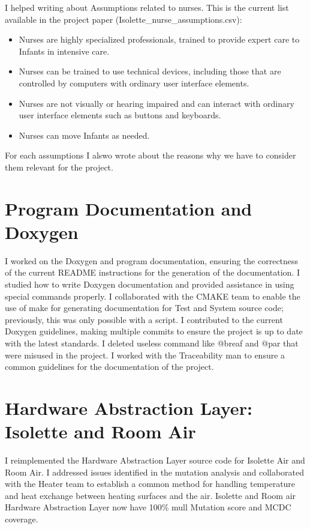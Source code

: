 \documentclass[a4paper, 12pt]{article}
\begin{document}
I helped writing about Assumptions related to nurses. 
This is the current list available in the project paper (Isolette\_nurse\_assumptions.csv):

\begin{itemize}
    \item Nurses are highly specialized professionals, trained to provide expert care to Infants in intensive care.
    \item Nurses can be trained to use technical devices, including those that are controlled by computers with ordinary user interface elements.
    \item Nurses are not visually or hearing impaired and can interact with ordinary user interface elements such as buttons and keyboards.
    \item Nurses can move Infants as needed.
\end{itemize}

For each assumptions I alswo wrote about the reasons why we have to consider them relevant for the project.


\section{Program Documentation and Doxygen}

I worked on the Doxygen and program documentation, ensuring the correctness of the current README instructions for the generation of the documentation.
I studied how to write Doxygen documentation and provided assistance in using special commands properly. 
I collaborated with the CMAKE team to enable the use of make for generating documentation for Test and System source code; previously, this was only possible with a script. 
I contributed to the current Doxygen guidelines, making multiple commits to ensure the project is up to date with the latest standards.
I deleted useless command like @breaf and @par that were misused in the project.
I worked with the Traceability man to ensure a common guidelines for the documentation of the project.

\section{Hardware Abstraction Layer: Isolette and Room Air}

I reimplemented the Hardware Abstraction Layer source code for Isolette Air and Room Air. I addressed issues identified in the mutation analysis and collaborated with the Heater team to establish a common method for handling temperature and heat exchange between heating surfaces and the air.
Isolette and Room air Hardware Abstraction Layer now have 100\% mull Mutation score and MCDC coverage.
\end{document}
